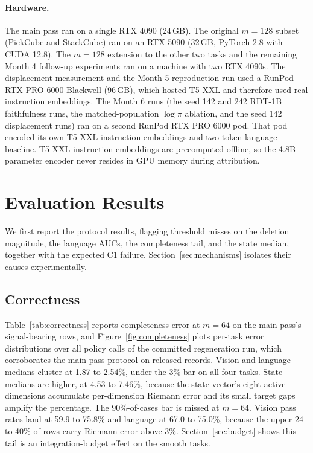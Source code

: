 \documentclass{article}
\begin{document}
\paragraph{Hardware.}
The main pass ran on a single RTX 4090 (24\,GB).
The original $m{=}128$ subset (PickCube and StackCube) ran on an RTX 5090 (32\,GB, PyTorch 2.8 with CUDA 12.8).
The $m{=}128$ extension to the other two tasks and the remaining Month 4 follow-up experiments ran on a machine with two RTX 4090s.
The displacement measurement and the Month 5 reproduction run used a RunPod RTX PRO 6000 Blackwell (96\,GB), which hosted T5-XXL and therefore used real instruction embeddings.
The Month 6 runs (the seed 142 and 242 RDT-1B faithfulness runs, the matched-population $\log\pi$ ablation, and the seed 142 displacement runs) ran on a second RunPod RTX PRO 6000 pod.
That pod encoded its own T5-XXL instruction embeddings and two-token language baseline.
T5-XXL instruction embeddings are precomputed offline, so the 4.8B-parameter encoder never resides in GPU memory during attribution.

\section{Evaluation Results}

We first report the protocol results, flagging threshold misses on the deletion magnitude, the language AUCs, the completeness tail, and the state median, together with the expected C1 failure.
Section~\ref{sec:mechanisms} isolates their causes experimentally.

\subsection{Correctness}

Table~\ref{tab:correctness} reports completeness error at $m{=}64$ on the main pass's signal-bearing rows, and Figure~\ref{fig:completeness} plots per-task error distributions over all policy calls of the committed regeneration run, which corroborates the main-pass protocol on released records.
Vision and language medians cluster at 1.87 to 2.54\%, under the 3\% bar on all four tasks.
State medians are higher, at 4.53 to 7.46\%, because the state vector's eight active dimensions accumulate per-dimension Riemann error and its small target gaps amplify the percentage.
The 90\%-of-cases bar is missed at $m{=}64$.
Vision pass rates land at 59.9 to 75.8\% and language at 67.0 to 75.0\%, because the upper 24 to 40\% of rows carry Riemann error above 3\%.
Section~\ref{sec:budget} shows this tail is an integration-budget effect on the smooth tasks.
\end{document}
